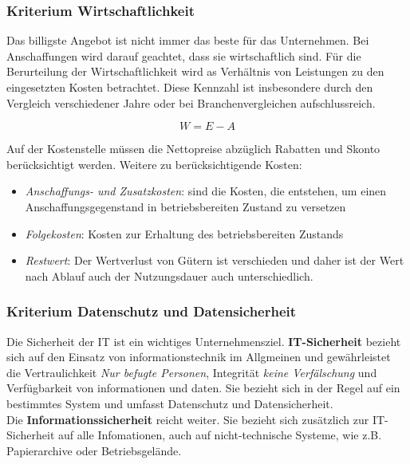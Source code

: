 \documentclass[a4paper, 12pt]{report}
\begin{document}
\begin{multicols}{2}
\subsubsection{Kriterium Wirtschaftlichkeit}

Das billigste Angebot ist nicht immer das beste für das Unternehmen. Bei
Anschaffungen wird darauf geachtet, dass sie wirtschaftlich sind. Für die
Berurteilung der Wirtschaftlichkeit wird as Verhältnis von Leistungen zu den
eingesetzten Kosten betrachtet. Diese Kennzahl ist insbesondere durch den
Vergleich verschiedener Jahre oder bei Branchenvergleichen aufschlussreich.

\begin{center}
    \begin{equation}
	W = E - A
    \end{equation}
\end{center}

Auf der Kostenstelle müssen die Nettopreise abzüglich Rabatten und Skonto
berücksichtigt werden. Weitere zu berücksichtigende Kosten:

\begin{itemize}
    \item \emph{Anschaffungs- und Zusatzkosten}: sind die Kosten, die entstehen,
	um einen Anschaffungsgegenstand in betriebsbereiten Zustand zu versetzen
    \item \emph{Folgekosten}: Kosten zur Erhaltung des betriebsbereiten Zustands
    \item \emph{Restwert}: Der Wertverlust von Gütern ist verschieden und daher
	ist der Wert nach Ablauf auch der Nutzungsdauer auch unterschiedlich.
\end{itemize}

\subsubsection{Kriterium Datenschutz und Datensicherheit}

Die Sicherheit der IT ist ein wichtiges Unternehmensziel. \textbf{IT-Sicherheit}
bezieht sich auf den Einsatz von informationstechnik im Allgmeinen und
gewährleistet die Vertraulichkeit \emph{Nur befugte Personen}, Integrität
\emph{keine Verfälschung} und Verfügbarkeit von informationen und daten. Sie
bezieht sich in der Regel auf ein bestimmtes System und umfasst Datenschutz und
Datensicherheit. \\

Die \textbf{Informationssicherheit} reicht weiter. Sie bezieht sich zusätzlich
zur IT-Sicherheit auf alle Infomationen, auch auf nicht-technische Systeme,
wie z.B. Papierarchive oder Betriebsgelände. \\


\end{multicols}
\end{document}
